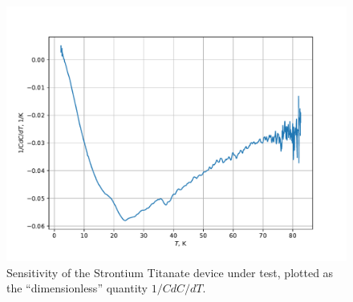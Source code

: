 \documentclass{thesis-umich}
\begin{document}
\begin{figure}
	\caption[Sensitivity of STO test device]{Sensitivity of the Strontium Titanate device under test, plotted as the ``dimensionless'' quantity \(1/C dC/dT\).}
	\includegraphics[width=\columnwidth]{figures/STO_dCdT_vs_T.pdf}
\end{figure}
\end{document}
